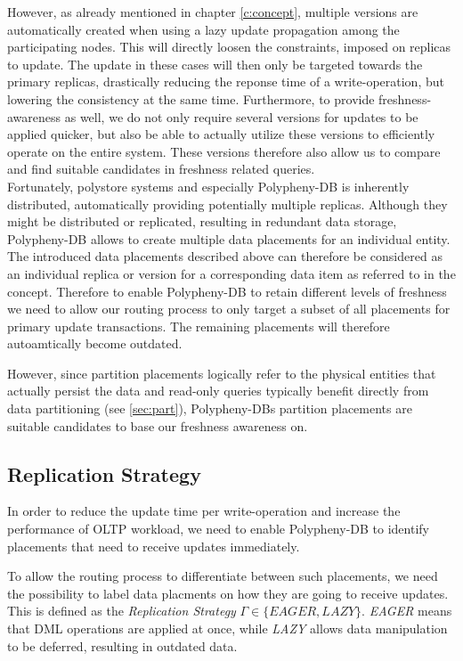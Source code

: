 However, as already mentioned in chapter \ref{c:concept}, multiple versions are automatically created when using a lazy update propagation among the participating nodes. 
This will directly loosen the constraints, imposed on replicas to update. 
The update in these cases will then only be targeted towards the primary replicas, drastically reducing the reponse time of a write-operation,
but lowering the consistency at the same time. 
Furthermore, to provide freshness-awareness as well, we do not only require several versions for updates to be applied quicker,
but also be able to actually utilize these versions to efficiently operate on the entire system.
These versions therefore also allow us to compare and find suitable candidates in freshness related queries.\\

Fortunately, polystore systems and especially Polypheny-DB is inherently distributed, automatically providing potentially multiple replicas.
Although they might be distributed or replicated, resulting in redundant data storage, Polypheny-DB allows to create multiple data placements for an individual entity.
The introduced data placements described above can therefore be considered as an individual replica or version for a corresponding data item as referred to in the concept.
Therefore to enable Polypheny-DB to retain different levels of freshness we need to allow our routing process
to only target a subset of all placements for primary update transactions. The remaining placements will therefore autoamtically become outdated. 

However, since partition placements logically refer to the physical entities that actually persist the data and 
read-only queries typically benefit directly from data partitioning (see \ref{sec:part}), Polypheny-DBs partition placements 
are suitable candidates to base our freshness awareness on.





\subsection{Replication Strategy}
\label{sec:strategy}

In order to reduce the update time per write-operation and increase the performance
of OLTP workload, we need to enable Polypheny-DB to identify placements that need to receive updates immediately. 

To allow the routing process to differentiate between such placements,
we need the possibility to label data placments on how they are going to receive updates. This is defined as the \emph{Replication Strategy} $\Gamma \in \{EAGER,LAZY\}$.
\emph{EAGER} means that DML operations are applied at once, while \emph{LAZY}
allows data manipulation to be deferred, resulting in outdated data.\\



